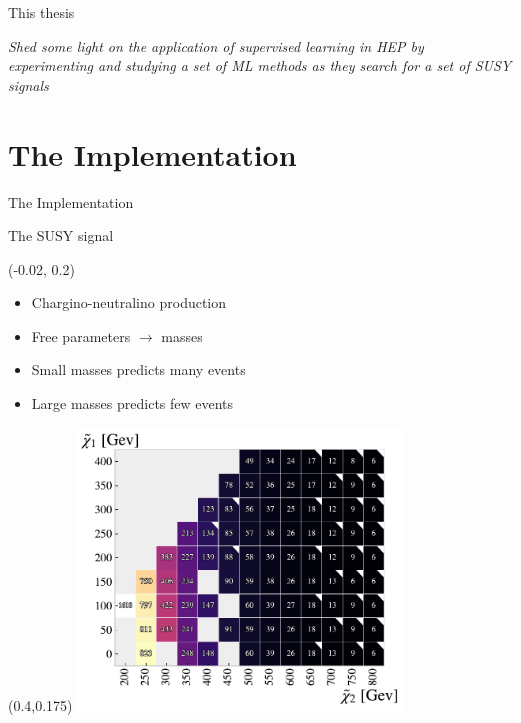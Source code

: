\documentclass[UKenglish]{beamer}
\begin{document}
\begin{frame}{This thesis}
    \vfill
    \begin{center}
        \emph{Shed some light on the application of supervised learning in HEP by 
        experimenting and studying a set of ML methods as they search for a set of SUSY signals}
    \end{center}
   
    \centering
\end{frame}

\section{The Implementation}
\begin{frame}{The Implementation}
    \tableofcontents[currentsection]
\end{frame}

\begin{frame}{The SUSY signal}
    \begin{textblock}{0.4}(-0.02, 0.2)
        \begin{itemize}
            \item Chargino-neutralino production
            \item Free parameters $\rightarrow$ masses 
            \item Small masses predicts many events 
            \item Large masses predicts few events 
        \end{itemize}
    \end{textblock}
    \begin{textblock}{.9}(0.4,0.175)
        \includegraphics[width=0.65\textwidth]{figures/Signal/NrSignalEvents.pdf}
    \end{textblock}
\end{frame}
\end{document}
